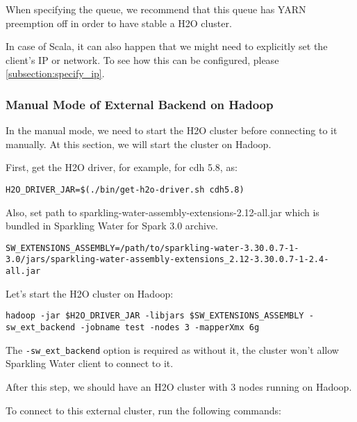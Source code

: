 When specifying the queue, we recommend that this queue has YARN preemption off in order to have stable a H2O cluster.

In case of Scala, it can also happen that we might need to explicitly set the client's IP or network. To see how this
can be configured, please \ref{subsection:specify_ip}.

\subsubsection{Manual Mode of External Backend on Hadoop}

In the manual mode, we need to start the H2O cluster before connecting to it manually. At this section, we
will start the cluster on Hadoop.

First, get the H2O driver, for example, for cdh 5.8, as:

\begin{lstlisting}[style=bash]
H2O_DRIVER_JAR=$(./bin/get-h2o-driver.sh cdh5.8)
\end{lstlisting}

Also, set path to sparkling-water-assembly-extensions-2.12-all.jar which is bundled in Sparkling Water for Spark 3.0 archive.

\begin{lstlisting}[style=bash]
SW_EXTENSIONS_ASSEMBLY=/path/to/sparkling-water-3.30.0.7-1-3.0/jars/sparkling-water-assembly-extensions_2.12-3.30.0.7-1-2.4-all.jar
\end{lstlisting}

Let's start the H2O cluster on Hadoop:

\begin{lstlisting}[style=bash]
hadoop -jar $H2O_DRIVER_JAR -libjars $SW_EXTENSIONS_ASSEMBLY -sw_ext_backend -jobname test -nodes 3 -mapperXmx 6g
\end{lstlisting}

The \texttt{-sw\_ext\_backend} option is required as without it, the cluster won't allow Sparkling Water client to connect to it.

After this step, we should have an H2O cluster with 3 nodes running on Hadoop.

To connect to this external cluster, run the following commands:

